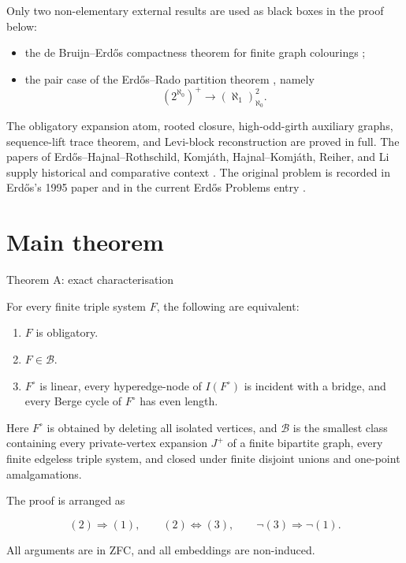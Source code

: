 \documentclass[11pt]{article}
\newcommand{\tightlist}{\setlength{\itemsep}{0pt}\setlength{\parskip}{0pt}}
\begin{document}
Only two non-elementary external results are used as black boxes in the proof below:

\begin{itemize}
\tightlist
\item
  the de Bruijn--Erdős compactness theorem for finite graph colourings \autocite{debruijn1951};
\item
  the pair case of the Erdős--Rado partition theorem \autocite{erdosrado1956}, namely \[(2^{\aleph_0})^+\longrightarrow(\aleph_1)^2_{\aleph_0}.\]
\end{itemize}

The obligatory expansion atom, rooted closure, high-odd-girth auxiliary graphs, sequence-lift trace theorem, and Levi-block reconstruction are proved in full. The papers of Erdős--Hajnal--Rothschild, Komjáth, Hajnal--Komjáth, Reiher, and Li supply historical and comparative context \autocite{ehr1973,komjath2001,hajnalkomjath2008,reiher2024,li2026}. The original problem is recorded in Erdős's 1995 paper and in the current Erdős Problems entry \autocite{erdos1995,bloom593}.

\section{Main theorem}\label{main-theorem}

\label{theorem-a-exact-characterisation}
\begin{theorembox}{Theorem A: exact characterisation}

For every finite triple system \(F\), the following are equivalent:

\begin{enumerate}
\def\labelenumi{\arabic{enumi}.}
\tightlist
\item
  \(F\) is obligatory.
\item
  \(F\in\mathcal B\).
\item
  \(F^\circ\) is linear, every hyperedge-node of \(I(F^\circ)\) is incident with a bridge, and every Berge cycle of \(F^\circ\) has even length.
\end{enumerate}

Here \(F^\circ\) is obtained by deleting all isolated vertices, and \(\mathcal B\) is the smallest class containing every private-vertex expansion \(J^+\) of a finite bipartite graph, every finite edgeless triple system, and closed under finite disjoint unions and one-point amalgamations.

The proof is arranged as

\[
(2)\Longrightarrow(1),\qquad
(2)\Longleftrightarrow(3),\qquad
\neg(3)\Longrightarrow\neg(1).
\]

All arguments are in ZFC, and all embeddings are non-induced.

\end{theorembox}
\end{document}
